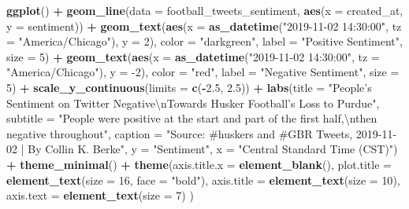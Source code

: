 \documentclass[
]{book}
\newenvironment{Shaded}{\begin{snugshade}}{\end{snugshade}}
\newcommand{\CharTok}[1]{\textcolor[rgb]{0.31,0.60,0.02}{#1}}
\newcommand{\DataTypeTok}[1]{\textcolor[rgb]{0.13,0.29,0.53}{#1}}
\newcommand{\DecValTok}[1]{\textcolor[rgb]{0.00,0.00,0.81}{#1}}
\newcommand{\FloatTok}[1]{\textcolor[rgb]{0.00,0.00,0.81}{#1}}
\newcommand{\KeywordTok}[1]{\textcolor[rgb]{0.13,0.29,0.53}{\textbf{#1}}}
\newcommand{\NormalTok}[1]{#1}
\newcommand{\OperatorTok}[1]{\textcolor[rgb]{0.81,0.36,0.00}{\textbf{#1}}}
\newcommand{\StringTok}[1]{\textcolor[rgb]{0.31,0.60,0.02}{#1}}
\begin{document}
\begin{Shaded}
\begin{Highlighting}[]
\KeywordTok{ggplot}\NormalTok{() }\OperatorTok{+}
\StringTok{  }\KeywordTok{geom_line}\NormalTok{(}\DataTypeTok{data =}\NormalTok{ football_tweets_sentiment, }\KeywordTok{aes}\NormalTok{(}\DataTypeTok{x =}\NormalTok{ created_at, }\DataTypeTok{y =}\NormalTok{ sentiment)) }\OperatorTok{+}
\StringTok{  }\KeywordTok{geom_text}\NormalTok{(}\KeywordTok{aes}\NormalTok{(}\DataTypeTok{x =} \KeywordTok{as_datetime}\NormalTok{(}\StringTok{"2019-11-02 14:30:00"}\NormalTok{, }\DataTypeTok{tz =} \StringTok{"America/Chicago"}\NormalTok{), }\DataTypeTok{y =} \DecValTok{2}\NormalTok{), }\DataTypeTok{color =} \StringTok{"darkgreen"}\NormalTok{, }\DataTypeTok{label =} \StringTok{"Positive Sentiment"}\NormalTok{, }\DataTypeTok{size =} \DecValTok{5}\NormalTok{) }\OperatorTok{+}
\StringTok{  }\KeywordTok{geom_text}\NormalTok{(}\KeywordTok{aes}\NormalTok{(}\DataTypeTok{x =} \KeywordTok{as_datetime}\NormalTok{(}\StringTok{"2019-11-02 14:30:00"}\NormalTok{, }\DataTypeTok{tz =} \StringTok{"America/Chicago"}\NormalTok{), }\DataTypeTok{y =} \DecValTok{-2}\NormalTok{), }\DataTypeTok{color =} \StringTok{"red"}\NormalTok{, }\DataTypeTok{label =} \StringTok{"Negative Sentiment"}\NormalTok{, }\DataTypeTok{size =} \DecValTok{5}\NormalTok{) }\OperatorTok{+}
\StringTok{  }\KeywordTok{scale_y_continuous}\NormalTok{(}\DataTypeTok{limits =} \KeywordTok{c}\NormalTok{(}\OperatorTok{-}\FloatTok{2.5}\NormalTok{, }\FloatTok{2.5}\NormalTok{)) }\OperatorTok{+}
\StringTok{  }\KeywordTok{labs}\NormalTok{(}\DataTypeTok{title =} \StringTok{"People's Sentiment on Twitter Negative}\CharTok{\textbackslash{}n}\StringTok{Towards Husker Football's Loss to Purdue"}\NormalTok{,}
       \DataTypeTok{subtitle =} \StringTok{"People were positive at the start and part of the first half,}\CharTok{\textbackslash{}n}\StringTok{then negative throughout"}\NormalTok{,}
       \DataTypeTok{caption =} \StringTok{"Source: #huskers and #GBR Tweets, 2019-11-02 | By Collin K. Berke"}\NormalTok{,}
       \DataTypeTok{y =} \StringTok{"Sentiment"}\NormalTok{,}
       \DataTypeTok{x =} \StringTok{"Central Standard Time (CST)"}\NormalTok{) }\OperatorTok{+}\StringTok{ }
\StringTok{  }\KeywordTok{theme_minimal}\NormalTok{() }\OperatorTok{+}
\StringTok{  }\KeywordTok{theme}\NormalTok{(}\DataTypeTok{axis.title.x =} \KeywordTok{element_blank}\NormalTok{(),}
        \DataTypeTok{plot.title =} \KeywordTok{element_text}\NormalTok{(}\DataTypeTok{size =} \DecValTok{16}\NormalTok{, }\DataTypeTok{face =} \StringTok{"bold"}\NormalTok{),}
    \DataTypeTok{axis.title =} \KeywordTok{element_text}\NormalTok{(}\DataTypeTok{size =} \DecValTok{10}\NormalTok{),}
    \DataTypeTok{axis.text =} \KeywordTok{element_text}\NormalTok{(}\DataTypeTok{size =} \DecValTok{7}\NormalTok{)}
\NormalTok{  )}
\end{Highlighting}
\end{Shaded}
\end{document}
